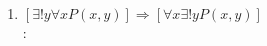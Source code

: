 \begin{enumerate}[label=0.1.\arabic*]
\begin{enumerate}[label=\arabic*)]
\begin{enumerate}[label=\roman*)]
			\item $ [\exists ! y \forall x P(x,y)] \Rightarrow [\forall x \exists ! y P(x,y)] $ \\
			\solucion: \\
			
		\end{enumerate}
	\end{enumerate}
	
\end{enumerate}


